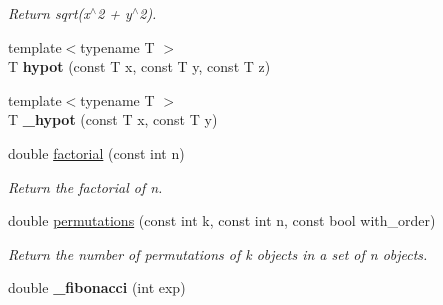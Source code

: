 \begin{DoxyCompactItemize}
\begin{DoxyCompactList}\small\item\em Return sqrt(x$^\wedge$2 + y$^\wedge$2). \end{DoxyCompactList}\item 
\mbox{\label{namespacecimg__library__suffixed_1_1cimg_abc2af0eccc1059711364e339d73c36cd}} 
{\footnotesize template$<$typename T $>$ }\\T {\bfseries hypot} (const T x, const T y, const T z)
\item 
\mbox{\label{namespacecimg__library__suffixed_1_1cimg_a9e49b17ee53d34a8df49b655eb915572}} 
{\footnotesize template$<$typename T $>$ }\\T {\bfseries \+\_\+hypot} (const T x, const T y)
\item 
\mbox{\label{namespacecimg__library__suffixed_1_1cimg_a5c4845e4f0f1c87ec1cd97d7a8923cb6}} 
double \hyperlink{namespacecimg__library__suffixed_1_1cimg_a5c4845e4f0f1c87ec1cd97d7a8923cb6}{factorial} (const int n)
\begin{DoxyCompactList}\small\item\em Return the factorial of n. \end{DoxyCompactList}\item 
\mbox{\label{namespacecimg__library__suffixed_1_1cimg_a4e6348dd82ed46fecc9f46981dc5bc0a}} 
double \hyperlink{namespacecimg__library__suffixed_1_1cimg_a4e6348dd82ed46fecc9f46981dc5bc0a}{permutations} (const int k, const int n, const bool with\+\_\+order)
\begin{DoxyCompactList}\small\item\em Return the number of permutations of k objects in a set of n objects. \end{DoxyCompactList}\item 
\mbox{\label{namespacecimg__library__suffixed_1_1cimg_af54e8ac35c9b3c07062005881b2c4e08}} 
double {\bfseries \+\_\+fibonacci} (int exp)
\item 
\mbox{\label{namespacecimg__library__suffixed_1_1cimg_aa9c0e571bc9644b4d838630f9a79534f}} 

\end{DoxyCompactItemize}
